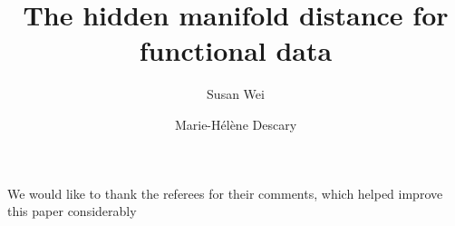 \documentclass{ecai}
\begin{document}
\title{The hidden manifold distance for functional data}

\author{Susan Wei \and Marie-H\'el\`{e}ne Descary}

\maketitle



\begin{abstract}

\end{abstract}







\ack We would like to thank the referees for their comments, which
helped improve this paper considerably

\newpage


\end{document}
